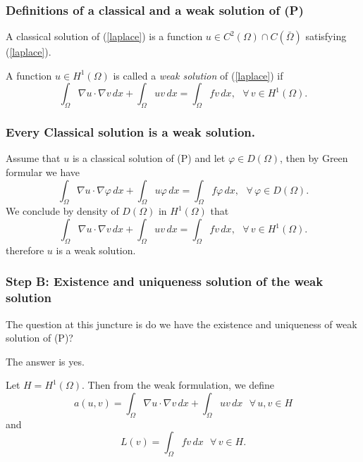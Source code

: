 \documentclass[7pt]{beamer}
\newcommand{\Om}{\Omega}
\newcommand{\vp}{\varphi}
\begin{document}
\begin{frame}
 \frametitle{Definitions of a classical and a weak solution of (P)}
\begin{definition}
A classical solution of (\ref{laplace}) is a
function $u\in C^2(\Om)\cap C(\bar \Om)$ satisfying (\ref{laplace}).
\end{definition}
\begin{definition}
A function $u\in H^1(\Om)$ is called a \textsl{weak solution} of
(\ref{laplace}) if
$$\int_\Om\nabla u\cdot\nabla v\,dx + \int_\Om uv\,dx = \int_\Om fv\,dx,\,\,\,\,\forall\,v\in H^1(\Om).$$
\end{definition}
\end{frame}

\begin{frame}
\frametitle{Every Classical solution is a weak solution.}
Assume that $u$ is a classical solution of (P) and let $\vp \in D(\Om)$, then by Green formular we have
$$
\int_\Om \nabla u\cdot \nabla \vp\,dx + \int_{\Om} u\vp \,dx = \int_\Om
f\vp\,dx,\,\,\,\,\forall\,\vp\in D(\Om).
$$
We conclude by density of $D(\Om)$ in $H^1(\Om)$ that
$$
\int_\Om \nabla u\cdot \nabla v\,dx + \int_{\Om} uv \,dx = \int_\Om
fv\,dx,\,\,\,\,\forall\,v\in H^1(\Om).
$$
therefore $u$ is a weak solution.
\end{frame}


\begin{frame}
 \frametitle{Step B: Existence and uniqueness solution of the weak solution}
The question at this juncture is do we have the existence and uniqueness of weak solution of (P)?
\begin{center}
The answer is yes.
\end{center}
Let $H=H^1(\Om)$. Then from the weak formulation, we define
$$a(u,v)=\int_\Om \nabla u\cdot \nabla v \,dx + \int_{\Om} uv \,dx \,\,\,\,\forall\,u,v\in H$$ 
and $$L(v)=\int_\Om
fv\,dx\,\,\,\,\forall\,v\in H.$$
\end{frame}
\end{document}
